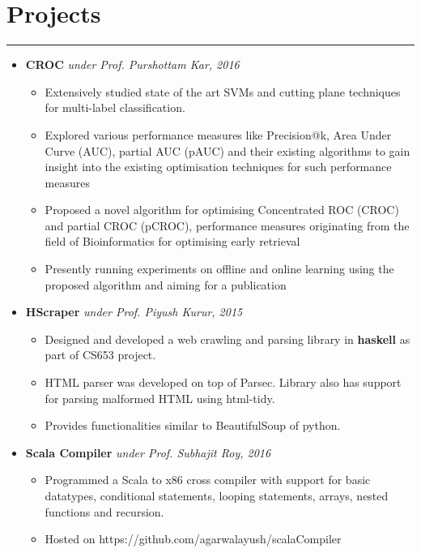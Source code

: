 \documentclass[a4paper]{article}
\begin{document}
\section*{Projects}
\hrule
\vspace{2mm}
  \begin{itemize}
     \setlength\itemsep{-0.1em}
     \item
    \textbf{CROC}
    \hfill \textit{under Prof. Purshottam Kar, 2016}
      \begin{itemize}
      \setlength\itemsep{-0.2em}
      \item Extensively studied state of the art SVMs and cutting plane techniques for multi-label classification.
      \item Explored various performance measures like Precision@k, Area Under Curve (AUC), partial AUC (pAUC) and their existing algorithms to gain insight into the existing optimisation techniques for such performance measures
      \item Proposed a novel algorithm for optimising Concentrated ROC (CROC) and partial CROC (pCROC), performance measures
originating from the field of Bioinformatics for optimising early retrieval
      \item Presently running experiments on offline and online learning using the proposed algorithm and aiming for a publication
      \end{itemize}

\vspace{6mm}

    \item 
    \textbf{HScraper}
    \hfill \textit{under Prof. Piyush Kurur, 2015}
    
	\begin{itemize}
      \setlength\itemsep{-0.2em}
      \item Designed and developed a web crawling and parsing library in \textbf{haskell} as part of CS653 project.
        \item HTML parser was developed on top of Parsec. Library also has support for parsing malformed HTML using html-tidy.
        \item Provides functionalities similar to BeautifulSoup of python.
    \end{itemize}



  \item
    \textbf{Scala Compiler}
    \hfill \textit{under Prof. Subhajit Roy, 2016}
	\begin{itemize}
      \setlength\itemsep{-0.2em}
      \item Programmed a Scala to x86 cross compiler with support for basic datatypes, conditional statements, looping statements,
arrays, nested functions and recursion.
      \item Hosted on https://github.com/agarwalayush/scalaCompiler\\
    \end{itemize}


\end{itemize}
\end{document}
